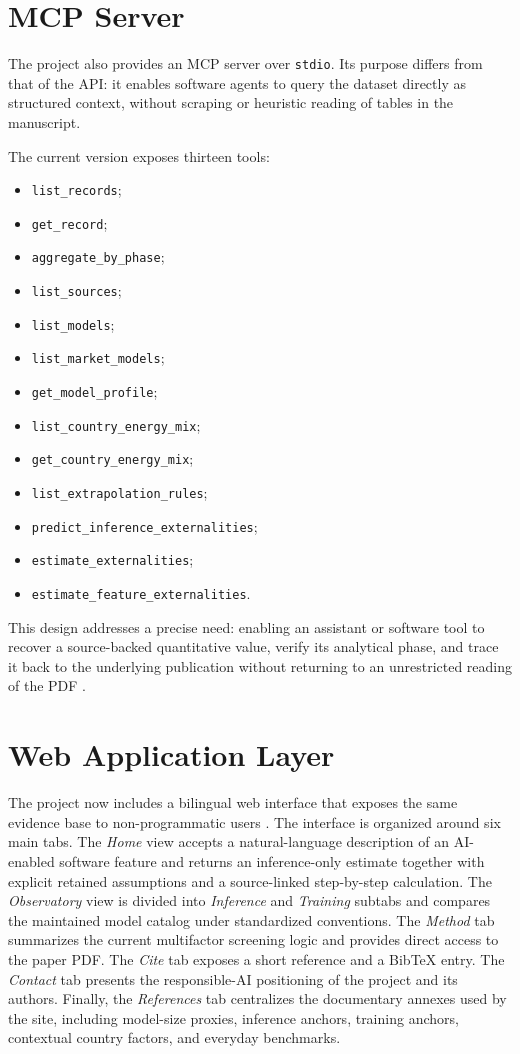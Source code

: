 \documentclass[11pt,a4paper]{article}
\begin{document}
\section{MCP Server}
The project also provides an MCP server over \texttt{stdio}. Its purpose differs from that of the API: it enables software agents to query the dataset directly as structured context, without scraping or heuristic reading of tables in the manuscript.

The current version exposes thirteen tools:
\begin{itemize}
\item \texttt{list\_records};
\item \texttt{get\_record};
\item \texttt{aggregate\_by\_phase};
\item \texttt{list\_sources};
\item \texttt{list\_models};
\item \texttt{list\_market\_models};
\item \texttt{get\_model\_profile};
\item \texttt{list\_country\_energy\_mix};
\item \texttt{get\_country\_energy\_mix};
\item \texttt{list\_extrapolation\_rules};
\item \texttt{predict\_inference\_externalities};
\item \texttt{estimate\_externalities};
\item \texttt{estimate\_feature\_externalities}.
\end{itemize}

This design addresses a precise need: enabling an assistant or software tool to recover a source-backed quantitative value, verify its analytical phase, and trace it back to the underlying publication without returning to an unrestricted reading of the PDF \cite{impactllmrepo2026}.

\section{Web Application Layer}
The project now includes a bilingual web interface that exposes the same evidence base to non-programmatic users \cite{impactllmrepo2026}. The interface is organized around six main tabs. The \emph{Home} view accepts a natural-language description of an AI-enabled software feature and returns an inference-only estimate together with explicit retained assumptions and a source-linked step-by-step calculation. The \emph{Observatory} view is divided into \emph{Inference} and \emph{Training} subtabs and compares the maintained model catalog under standardized conventions. The \emph{Method} tab summarizes the current multifactor screening logic and provides direct access to the paper PDF. The \emph{Cite} tab exposes a short reference and a BibTeX entry. The \emph{Contact} tab presents the responsible-AI positioning of the project and its authors. Finally, the \emph{References} tab centralizes the documentary annexes used by the site, including model-size proxies, inference anchors, training anchors, contextual country factors, and everyday benchmarks.
\end{document}
